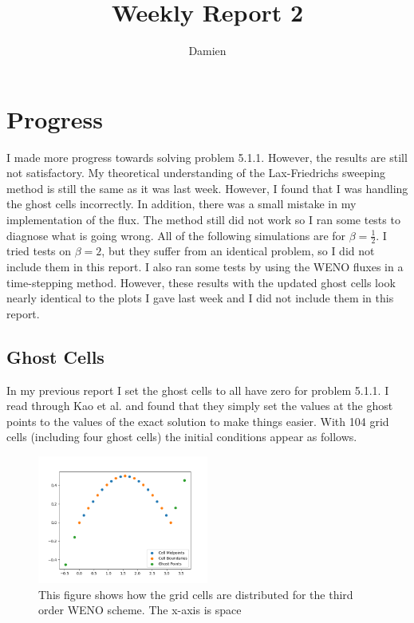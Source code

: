 \documentclass{article}
\title{Weekly Report 2}
\author{Damien}
\begin{document}
\maketitle
\section{Progress}
I made more progress towards solving problem 5.1.1. However, the results are still not satisfactory. My theoretical understanding of the Lax-Friedrichs sweeping method is still the same as it was last week. However, I found that I was handling the ghost cells incorrectly. In addition, there was a small mistake in my implementation of the flux. The method still did not work so I ran some tests to diagnose what is going wrong. All of the following simulations are for $\beta = \frac{1}{2}$. I tried tests on $\beta=2$, but they suffer from an identical problem, so I did not include them in this report. I also ran some tests by using the WENO fluxes in a time-stepping method. However, these results with the updated ghost cells look nearly identical to the plots I gave last week and I did not include them in this report.
\subsection{Ghost Cells}
In my previous report I set the ghost cells to all have zero for problem 5.1.1. I read through Kao et al. and found that they simply set the values at the ghost points to the values of the exact solution to make things easier. With 104 grid cells (including four ghost cells) the initial conditions appear as follows.
\begin{figure}[h]
    \centering
    \includegraphics[width=0.5\textwidth]{imgs/ics.png}
    \caption{This figure shows how the grid cells are distributed for the third order WENO scheme. The x-axis is space}
    \label{fig:ics}
\end{figure}
\end{document}
